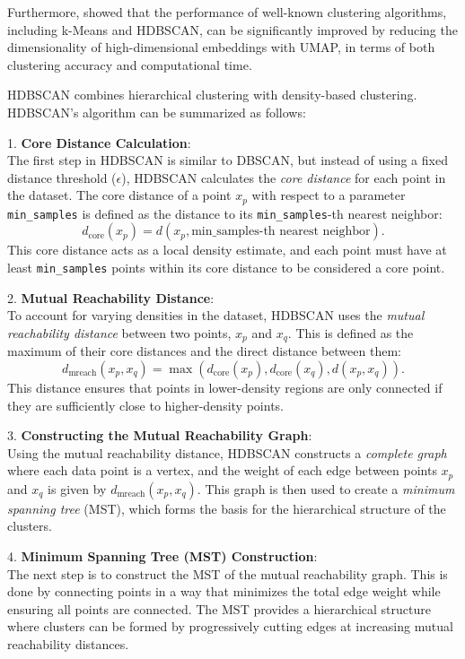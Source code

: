 Furthermore, \citet{allaoui_considerably_2020} showed that the performance of well-known clustering algorithms, including k-Means and HDBSCAN, can be significantly improved by reducing the dimensionality of high-dimensional embeddings with UMAP, in terms of both clustering accuracy and computational time.

HDBSCAN combines hierarchical clustering with density-based clustering. HDBSCAN's algorithm can be summarized as follows:

1. \textbf{Core Distance Calculation}: \\
The first step in HDBSCAN is similar to DBSCAN, but instead of using a fixed distance threshold ($\epsilon$), HDBSCAN calculates the \textit{core distance} for each point in the dataset. The core distance of a point $x_p$ with respect to a parameter \texttt{min\_samples} is defined as the distance to its \texttt{min\_samples}-th nearest neighbor:
\[
    d_{\text{core}}(x_p) = d(x_p, \text{min\_samples-th nearest neighbor}).
\]
This core distance acts as a local density estimate, and each point must have at least \texttt{min\_samples} points within its core distance to be considered a core point.

2. \textbf{Mutual Reachability Distance}: \\
To account for varying densities in the dataset, HDBSCAN uses the \textit{mutual reachability distance} between two points, $x_p$ and $x_q$. This is defined as the maximum of their core distances and the direct distance between them:
\[
    d_{\text{mreach}}(x_p, x_q) = \max \left( d_{\text{core}}(x_p), d_{\text{core}}(x_q), d(x_p, x_q) \right).
\]
This distance ensures that points in lower-density regions are only connected if they are sufficiently close to higher-density points.

3. \textbf{Constructing the Mutual Reachability Graph}: \\
Using the mutual reachability distance, HDBSCAN constructs a \textit{complete graph} where each data point is a vertex, and the weight of each edge between points $x_p$ and $x_q$ is given by $d_{\text{mreach}}(x_p, x_q)$. This graph is then used to create a \textit{minimum spanning tree} (MST), which forms the basis for the hierarchical structure of the clusters.

4. \textbf{Minimum Spanning Tree (MST) Construction}: \\
The next step is to construct the MST of the mutual reachability graph. This is done by connecting points in a way that minimizes the total edge weight while ensuring all points are connected. The MST provides a hierarchical structure where clusters can be formed by progressively cutting edges at increasing mutual reachability distances.

